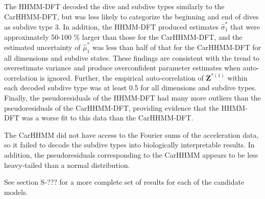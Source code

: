The HHMM-DFT decoded the dive and subdive types similarly to the CarHHMM-DFT, but was less likely to categorize the beginning and end of dives as subdive type 3. In addition, the HHMM-DFT produced estimates $\hat \sigma_1^*$ that were approximately 50-100 \% larger than those for the CarHHMM-DFT, and the estimated uncertainty of $\hat \mu^*_1$ was less than half of that for the CarHHMM-DFT for all dimensions and subdive states. These findings are consistent with the trend to overestimate variance and produce overconfident parameter estimates when auto-correlation is ignored. Further, the empirical auto-correlation of $\mathbf{Z}^{*(1)}$ within each decoded subdive type was at least 0.5 for all dimensions and subdive types. Finally, the pseudoresiduals of the HHMM-DFT had many more outliers than the pseudoresiduals of the CarHHMM-DFT, providing evidence that the HHMM-DFT was a worse fit to this data than the CarHHMM-DFT.

The CarHHMM did not have access to the Fourier sums of the acceleration data, so it failed to decode the subdive types into biologically interpretable results. In addition, the pseudoresiduals corresponding to the CarHHMM appears to be less heavy-tailed than a normal distribution. 

See section S-??? for a more complete set of results for each of the candidate models.

